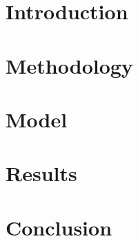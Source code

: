 \documentclass[12pt]{article}
\begin{document}
\maketitle


\section{Introduction}
\section{Methodology}
\section{Model}
\section{Results}
\section{Conclusion}

%
%
\end{document}
